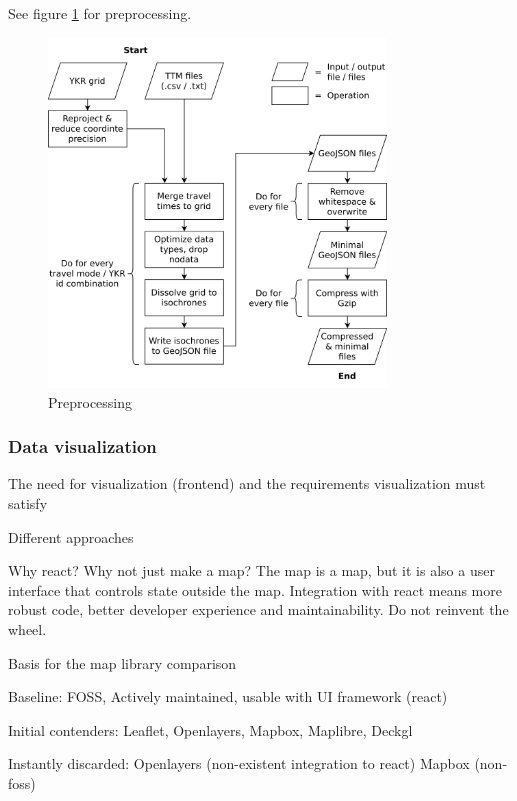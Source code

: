 
See figure \ref{fig:preprocessing} for preprocessing.

\begin{figure}[H]
	\centering
	\includegraphics[width=0.8\textwidth]{visual/figures/diagrams/preprocessing.png}
	\caption{Preprocessing}
	\label{fig:preprocessing}
\end{figure}


\subsubsection{Data visualization}

The need for visualization (frontend) and the requirements visualization must satisfy

Different approaches

Why react? Why not just make a map?
The map is a map, but it is also a user interface that controls state outside the map.
Integration with react means more robust code, better developer experience and maintainability.
Do not reinvent the wheel.

Basis for the map library comparison

Baseline: FOSS, Actively maintained, usable with UI framework (react)

Initial contenders: Leaflet, Openlayers, Mapbox, Maplibre, Deckgl

Instantly discarded: Openlayers (non-existent integration to react) Mapbox (non-foss)

